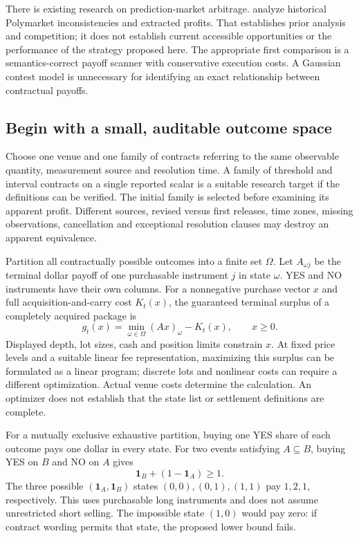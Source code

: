 \documentclass[11pt]{article}
\newcommand{\one}{\mathbf 1}
\theoremstyle{remark}\newtheorem{example}{Example}
\begin{document}
There is existing research on prediction-market arbitrage.
\citet{saguillo2025} analyze historical Polymarket inconsistencies and extracted
profits. That establishes prior analysis and competition; it does not establish
current accessible opportunities or the performance of the strategy proposed
here. The appropriate first comparison is a semantics-correct payoff scanner
with conservative execution costs. A Gaussian contest model is unnecessary for
identifying an exact relationship between contractual payoffs.

\subsection{Begin with a small, auditable outcome space}
Choose one venue and one family of contracts referring to the same observable
quantity, measurement source and resolution time. A family of threshold and
interval contracts on a single reported scalar is a suitable research target
if the definitions can be verified. The initial family is selected before
examining its apparent profit. Different sources, revised versus first releases,
time zones, missing observations, cancellation and exceptional resolution
clauses may destroy an apparent equivalence.

Partition all contractually possible outcomes into a finite set $\Omega$.
Let $A_{\omega j}$ be the terminal dollar payoff of one purchasable instrument
$j$ in state $\omega$. YES and NO instruments have their own columns. For a
nonnegative purchase vector $x$ and full acquisition-and-carry cost $K_t(x)$,
the guaranteed terminal surplus of a completely acquired package is
\begin{equation}\label{eq:payoff}
 g_t(x)=\min_{\omega\in\Omega}(Ax)_\omega-K_t(x),\qquad x\geq0.
\end{equation}
Displayed depth, lot sizes, cash and position limits constrain $x$. At fixed
price levels and a suitable linear fee representation, maximizing this surplus
can be formulated as a linear program; discrete lots and nonlinear costs can
require a different optimization. Actual venue costs determine the calculation.
An optimizer does not establish that the state list or settlement definitions
are complete.

For a mutually exclusive exhaustive partition, buying one YES share of each
outcome pays one dollar in every state. For two events satisfying
$A\subseteq B$, buying YES on $B$ and NO on $A$ gives
\begin{equation}\label{eq:implication}
 \one_B+(1-\one_A)\geq1.
\end{equation}
The three possible $(\one_A,\one_B)$ states $(0,0),(0,1),(1,1)$ pay
$1,2,1$, respectively. This uses purchasable long instruments and does not
assume unrestricted short selling. The impossible state $(1,0)$ would pay zero:
if contract wording permits that state, the proposed lower bound fails.
\end{document}
